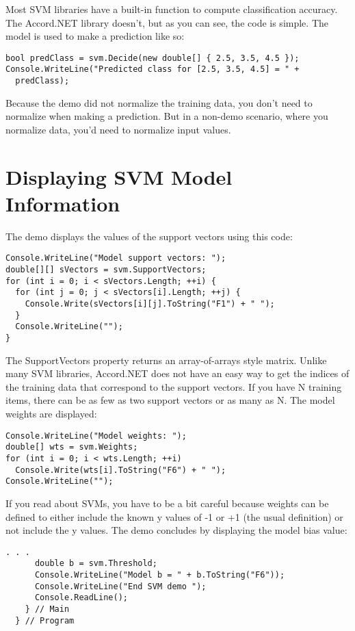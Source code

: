 \documentclass[13pt]{article}
\begin{document}
Most SVM libraries have a built-in function to compute classification accuracy. The Accord.NET library doesn't, but as you can see, the code is simple. The model is used to make a prediction like so:

\begin{verbatim}
bool predClass = svm.Decide(new double[] { 2.5, 3.5, 4.5 });
Console.WriteLine("Predicted class for [2.5, 3.5, 4.5] = " +
  predClass);
\end{verbatim}

Because the demo did not normalize the training data, you don't need to normalize when making a prediction. But in a non-demo scenario, where you normalize data, you'd need to normalize input values.

\section{Displaying SVM Model Information}

The demo displays the values of the support vectors using this code:

\begin{verbatim}
Console.WriteLine("Model support vectors: ");
double[][] sVectors = svm.SupportVectors;
for (int i = 0; i < sVectors.Length; ++i) {
  for (int j = 0; j < sVectors[i].Length; ++j) {
    Console.Write(sVectors[i][j].ToString("F1") + " ");
  }
  Console.WriteLine("");
}
\end{verbatim}

The SupportVectors property returns an array-of-arrays style matrix. Unlike many SVM libraries, Accord.NET does not have an easy way to get the indices of the training data that correspond to the support vectors. If you have N training items, there can be as few as two support vectors or as many as N. The model weights are displayed:

\begin{verbatim}
Console.WriteLine("Model weights: ");
double[] wts = svm.Weights;
for (int i = 0; i < wts.Length; ++i)
  Console.Write(wts[i].ToString("F6") + " ");
Console.WriteLine("");
\end{verbatim}

If you read about SVMs, you have to be a bit careful because weights can be defined to either include the known y values of -1 or +1 (the usual definition) or not include the y values. The demo concludes by displaying the model bias value:

\begin{verbatim}
. . .
      double b = svm.Threshold;
      Console.WriteLine("Model b = " + b.ToString("F6"));
      Console.WriteLine("End SVM demo ");
      Console.ReadLine();
    } // Main
  } // Program
 \end{verbatim}
 
\end{document}

